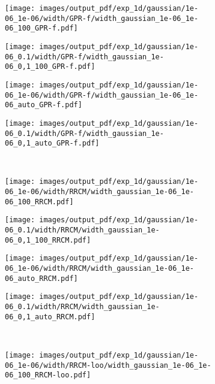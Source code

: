 \documentclass[a4paper,14pt]{extarticle}
\begin{document}
\begin{figure}%
  \centering
  \begin{subfigure}[b]{0.25\linewidth}
    \texttt{[image: images/output\_pdf/exp\_1d/gaussian/1e-06\_1e-06/width/GPR-f/width\_gaussian\_1e-06\_1e-06\_100\_GPR-f.pdf]}
  \end{subfigure}%
  \begin{subfigure}[b]{0.25\linewidth}
    \texttt{[image: images/output\_pdf/exp\_1d/gaussian/1e-06\_0.1/width/GPR-f/width\_gaussian\_1e-06\_0,1\_100\_GPR-f.pdf]}
  \end{subfigure}%
  \begin{subfigure}[b]{0.25\linewidth}
    \texttt{[image: images/output\_pdf/exp\_1d/gaussian/1e-06\_1e-06/width/GPR-f/width\_gaussian\_1e-06\_1e-06\_auto\_GPR-f.pdf]}
  \end{subfigure}%
  \begin{subfigure}[b]{0.25\linewidth}
    \texttt{[image: images/output\_pdf/exp\_1d/gaussian/1e-06\_0.1/width/GPR-f/width\_gaussian\_1e-06\_0,1\_auto\_GPR-f.pdf]}
  \end{subfigure}\\
  \begin{subfigure}[b]{0.25\linewidth}
    \texttt{[image: images/output\_pdf/exp\_1d/gaussian/1e-06\_1e-06/width/RRCM/width\_gaussian\_1e-06\_1e-06\_100\_RRCM.pdf]}
  \end{subfigure}%
  \begin{subfigure}[b]{0.25\linewidth}
    \texttt{[image: images/output\_pdf/exp\_1d/gaussian/1e-06\_0.1/width/RRCM/width\_gaussian\_1e-06\_0,1\_100\_RRCM.pdf]}
  \end{subfigure}%
  \begin{subfigure}[b]{0.25\linewidth}
    \texttt{[image: images/output\_pdf/exp\_1d/gaussian/1e-06\_1e-06/width/RRCM/width\_gaussian\_1e-06\_1e-06\_auto\_RRCM.pdf]}
  \end{subfigure}%
  \begin{subfigure}[b]{0.25\linewidth}
    \texttt{[image: images/output\_pdf/exp\_1d/gaussian/1e-06\_0.1/width/RRCM/width\_gaussian\_1e-06\_0,1\_auto\_RRCM.pdf]}
  \end{subfigure}\\
  \begin{subfigure}[b]{0.25\linewidth}
    \texttt{[image: images/output\_pdf/exp\_1d/gaussian/1e-06\_1e-06/width/RRCM-loo/width\_gaussian\_1e-06\_1e-06\_100\_RRCM-loo.pdf]}

\end{subfigure}
\end{figure}
\end{document}
